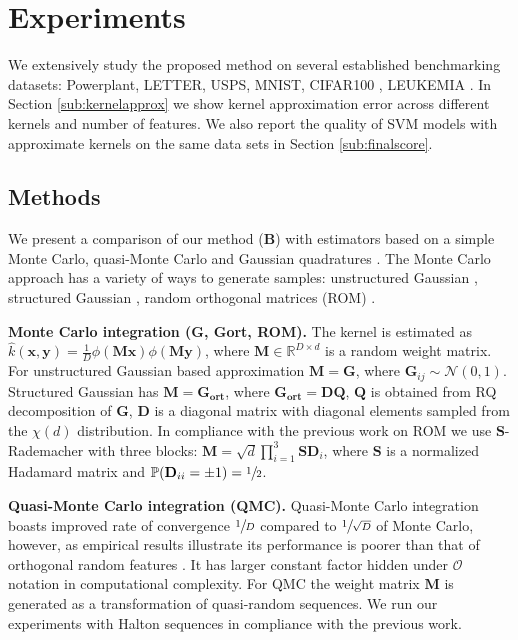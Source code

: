 \section{Experiments}
\label{sec:experiments}

We extensively study the proposed method on several established benchmarking datasets: Powerplant, LETTER, USPS, MNIST, CIFAR100 \citep{krizhevsky2009learning}, LEUKEMIA \citep{golub1999molecular}. In Section \ref{sub:kernelapprox} we show kernel approximation error across different kernels and number of features. We also report the quality of SVM models with approximate kernels on the same data sets in Section \ref{sub:finalscore}.

\subsection{Methods}
\label{subsub:methods}
We present a comparison of our method ($\mathbf{B}$) with estimators based on a simple Monte Carlo, quasi-Monte Carlo \citep{yang2014quasi} and Gaussian quadratures \citep{dao2017gaussian}. The Monte Carlo approach has a variety of ways to generate samples: unstructured Gaussian \citep{rahimi2008random}, structured Gaussian \citep{felix2016orthogonal}, random orthogonal matrices (ROM) \citep{choromanski2017unreasonable}.

\textbf{Monte Carlo integration (G, Gort, ROM).} The kernel is estimated as ${\hat{k}(\mathbf{x},\mathbf{y}) = \frac{1}{D} \phi(\mathbf{Mx}) \phi(\mathbf{My})}$, where $\mathbf{M} \in \mathbb{R}^{D \times d}$ is a random weight matrix. For unstructured Gaussian based approximation $\mathbf{M} = \mathbf{G}$, where $\mathbf{G}_{ij} \sim \mathcal{N}(0,1)$. Structured Gaussian has $\mathbf{M} = \mathbf{G_{\text{ort}}}$, where $\mathbf{G_{\text{ort}}} = \mathbf{D}\mathbf{Q}$, $\mathbf{Q}$ is obtained from RQ decomposition of $\mathbf{G}$,
$\mathbf{D}$ is a diagonal matrix with diagonal elements sampled from the $\chi(d)$ distribution. In compliance with the previous work on ROM we use $\mathbf{S}$-Rademacher with three blocks: $\mathbf{M} = \sqrt{d}\prod\limits_{i=1}^{3} \mathbf{SD}_i$, where $\mathbf{S}$ is a normalized Hadamard matrix and $\mathbb{P}(\mathbf{D}_{ii} = \pm 1) = \sfrac{1}{2}$.

\textbf{Quasi-Monte Carlo integration (QMC).} Quasi-Monte Carlo integration boasts improved rate of convergence $\sfrac{1}{D}$ compared to $\sfrac{1}{\sqrt{D}}$ of Monte Carlo, however, as empirical results illustrate its performance is poorer than that of orthogonal random features \citep{felix2016orthogonal}. It has larger constant factor hidden under $\mathcal{O}$ notation in computational complexity. For QMC the weight matrix $\mathbf{M}$ is generated as a transformation of quasi-random sequences. We run our experiments with Halton sequences in compliance with the previous work.

